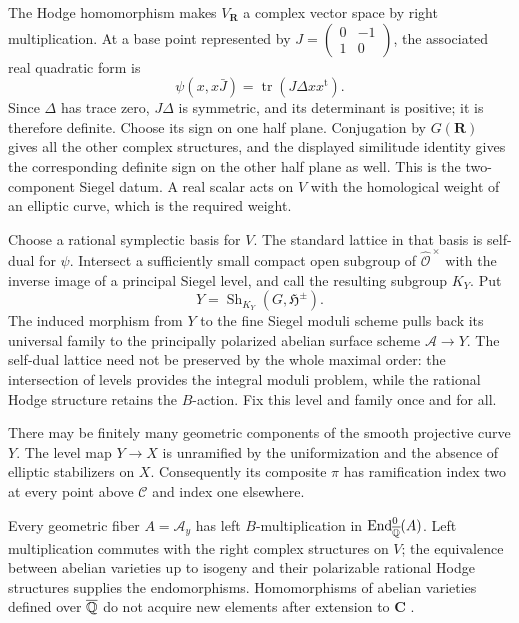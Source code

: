 The Hodge homomorphism makes $V_{\mathbf R}$ a complex vector space by
right multiplication.  At a base point represented by
$J=\left(\begin{smallmatrix}0&-1\\1&0\end{smallmatrix}\right)$,
the associated real quadratic form is
\[
 \psi(x,x\bar J)=\operatorname{tr}(J\Delta xx^{\mathrm t}).
\]
Since $\Delta$ has trace zero, $J\Delta$ is symmetric, and its
determinant is positive; it is therefore definite.  Choose its sign
on one half plane.  Conjugation by $G(\mathbf R)$ gives all the other
complex structures, and the displayed similitude identity gives the
corresponding definite sign on the other half plane as well.  This is
the two-component Siegel datum.  A real scalar acts on $V$ with the
homological weight of an elliptic curve, which is the required weight.

Choose a rational symplectic basis for $V$.  The standard lattice in
that basis is self-dual for $\psi$.  Intersect a sufficiently small
compact open subgroup of $\widehat{\mathcal O}^{\,\times}$ with the
inverse image of a principal Siegel level, and call the resulting
subgroup $K_Y$.  Put
\[
                 Y=\operatorname{Sh}_{K_Y}(G,\mathfrak H^\pm).
\]
The induced morphism from $Y$ to the fine Siegel moduli scheme pulls
back its universal family to the principally polarized abelian
surface scheme $\mathcal A\to Y$.
The self-dual lattice need not be preserved by the whole maximal
order: the intersection of levels provides the integral moduli
problem, while the rational Hodge structure retains the $B$-action.
Fix this level and family once and for all.

There may be finitely many geometric components of the smooth
projective curve $Y$.  The level map $Y\to X$ is unramified by the
uniformization and the absence of elliptic stabilizers on $X$.
Consequently its composite $\pi$ has ramification index two at
every point above $\mathcal C$ and index one elsewhere.

Every geometric fiber $A=\mathcal A_y$ has left $B$-multiplication in
$\operatorname{End}^0_{\overline{\mathbb Q}}(A)$.  Left multiplication commutes
with the right complex structures on $V$; the equivalence between
abelian varieties up to isogeny and their polarizable rational Hodge
structures supplies the endomorphisms.  Homomorphisms of abelian
varieties defined over $\overline{\mathbb Q}$ do not acquire new elements after
extension to $\mathbf C$ \cite{Mumford1970}.

